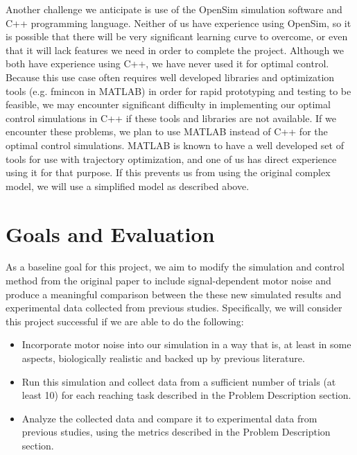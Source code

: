 \documentclass[table,12pt]{article}
\begin{document}
Another challenge we anticipate is use of the OpenSim simulation software and C++ programming language. Neither of us have experience using OpenSim, so it is possible that there will be very significant learning curve to overcome, or even that it will lack features we need in order to complete the project. Although we both have experience using C++, we have never used it for optimal control. Because this use case often requires well developed libraries and optimization tools (e.g. fmincon in MATLAB) in order for rapid prototyping and testing to be feasible, we may encounter significant difficulty in implementing our optimal control simulations in C++ if these tools and libraries are not available. If we encounter these problems, we plan to use MATLAB instead of C++ for the optimal control simulations. MATLAB is known to have a well developed set of tools for use with trajectory optimization, and one of us has direct experience using it for that purpose. If this prevents us from using the original complex model, we will use a simplified model as described above.

\section{Goals and Evaluation}
As a baseline goal for this project, we aim to modify the simulation and control method from the original paper to include signal-dependent motor noise and produce a meaningful comparison between the these new simulated results and experimental data collected from previous studies. Specifically, we will consider this project successful if we are able to do the following:
\begin{itemize}
    \item Incorporate motor noise into our simulation in a way that is, at least in some aspects, biologically realistic and backed up by previous literature.
    \item Run this simulation and collect data from a sufficient number of trials (at least 10) for each reaching task described in the Problem Description section.
    \item Analyze the collected data and compare it to experimental data from previous studies, using the metrics described in the Problem Description section.
\end{itemize}
\end{document}

